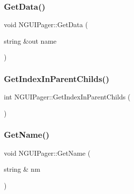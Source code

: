 \hypertarget{class_n_g_u_i_pager_ab9a35c58ac41c6a129843338c661f8a5}{}\label{class_n_g_u_i_pager_ab9a35c58ac41c6a129843338c661f8a5} 
\subsubsection{\texorpdfstring{Get\+Data()}{GetData()}}
{\footnotesize\ttfamily void N\+G\+U\+I\+Pager\+::\+Get\+Data (\begin{DoxyParamCaption}\item[{string \&out}]{name }\end{DoxyParamCaption})}

\hypertarget{class_n_g_u_i_pager_a69dfcdc43fe85404a9c4417dc47342ed}{}\label{class_n_g_u_i_pager_a69dfcdc43fe85404a9c4417dc47342ed} 
\subsubsection{\texorpdfstring{Get\+Index\+In\+Parent\+Childs()}{GetIndexInParentChilds()}}
{\footnotesize\ttfamily int N\+G\+U\+I\+Pager\+::\+Get\+Index\+In\+Parent\+Childs (\begin{DoxyParamCaption}{ }\end{DoxyParamCaption})}

\hypertarget{class_n_g_u_i_pager_a668a6f588b13193f5155e74db2c4188d}{}\label{class_n_g_u_i_pager_a668a6f588b13193f5155e74db2c4188d} 
\subsubsection{\texorpdfstring{Get\+Name()}{GetName()}}
{\footnotesize\ttfamily void N\+G\+U\+I\+Pager\+::\+Get\+Name (\begin{DoxyParamCaption}\item[{string \&}]{nm }\end{DoxyParamCaption})}

\hypertarget{class_n_g_u_i_pager_af03ec0de7e7004c1133fdaaf0b08cff9}{}\label{class_n_g_u_i_pager_af03ec0de7e7004c1133fdaaf0b08cff9} 
